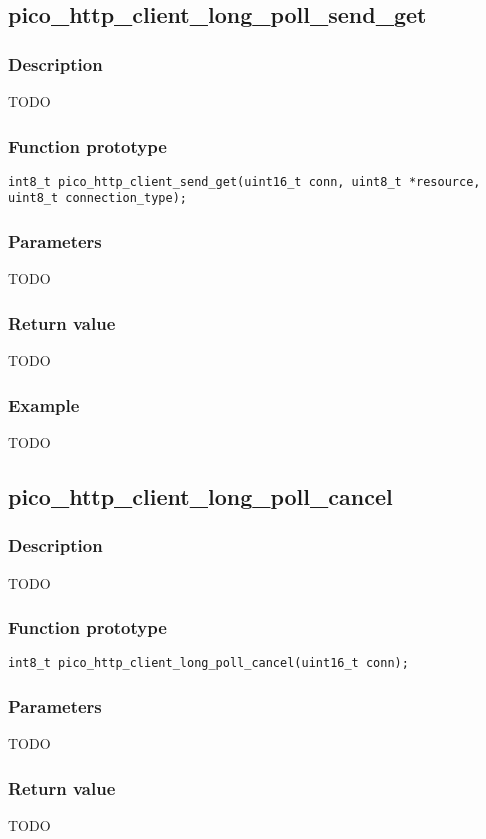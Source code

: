 \subsection{pico\_http\_client\_long\_poll\_send\_get}

\subsubsection*{Description}
TODO

\subsubsection*{Function prototype}
\texttt{int8\_t pico\_http\_client\_send\_get(uint16\_t conn, uint8\_t *resource, uint8\_t connection\_type);}

\subsubsection*{Parameters}
TODO
\subsubsection*{Return value}
TODO
\subsubsection*{Example}
TODO


\subsection{pico\_http\_client\_long\_poll\_cancel}

\subsubsection*{Description}
TODO

\subsubsection*{Function prototype}
\texttt{int8\_t pico\_http\_client\_long\_poll\_cancel(uint16\_t conn);}

\subsubsection*{Parameters}
TODO
\subsubsection*{Return value}
TODO
